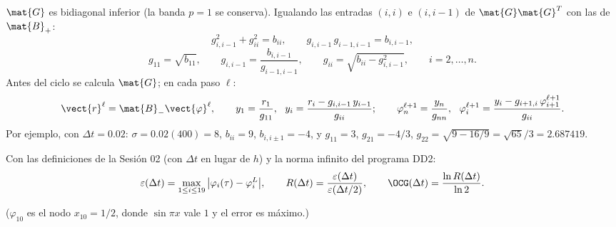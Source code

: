 $\mat{G}$ es bidiagonal inferior (la banda $p = 1$ se conserva). Igualando las entradas $(i, i)$ e
$(i, i-1)$ de $\mat{G}\mat{G}^T$ con las de $\mat{B}_+$:
\[
  g_{i,i-1}^2 + g_{ii}^2 = b_{ii}, \qquad g_{i,i-1}\,g_{i-1,i-1} = b_{i,i-1},
\]
\[
  g_{11} = \sqrt{b_{11}}, \qquad g_{i,i-1} = \frac{b_{i,i-1}}{g_{i-1,i-1}}, \qquad
  g_{ii} = \sqrt{b_{ii} - g_{i,i-1}^2}, \qquad i = 2, \dots, n .
\]
Antes del ciclo se calcula $\mat{G}$; en cada paso $\ell$:
\[
  \vect{r}^\ell = \mat{B}_-\vect{\varphi}^\ell,\qquad
  y_1 = \frac{r_1}{g_{11}},\ \ y_i = \frac{r_i - g_{i,i-1}\,y_{i-1}}{g_{ii}};\qquad
  \varphi_n^{\ell+1} = \frac{y_n}{g_{nn}},\ \ \varphi_i^{\ell+1} = \frac{y_i - g_{i+1,i}\,\varphi_{i+1}^{\ell+1}}{g_{ii}} .
\]
Por ejemplo, con $\Delta t = 0.02$: $\sigma = 0.02(400) = 8$, $b_{ii} = 9$, $b_{i,i\pm1} = -4$, y
$g_{11} = 3$, $g_{21} = -4/3$, $g_{22} = \sqrt{9 - 16/9} = \sqrt{65}/3 = 2.687419$.

Con las definiciones de la Sesión 02 (con $\Delta t$ en lugar de $h$) y la norma infinito del programa DD2:
\[
  \varepsilon(\Delta t) = \max_{1\le i\le 19}\big|\varphi_i(\tau) - \varphi_i^L\big|, \qquad
  R(\Delta t) = \frac{\varepsilon(\Delta t)}{\varepsilon(\Delta t/2)}, \qquad
  \OCG(\Delta t) = \frac{\ln R(\Delta t)}{\ln 2}.
\]
\begin{center}
\end{center}
($\varphi_{10}$ es el nodo $x_{10} = 1/2$, donde $\sin\pi x$ vale $1$ y el error es máximo.)

